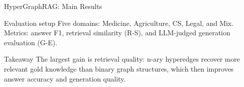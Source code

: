 \begin{frame}{HyperGraphRAG: Main Results}
\scriptsize
\begin{block}{Evaluation setup}
Five domains: Medicine, Agriculture, CS, Legal, and Mix. Metrics: answer F1, retrieval similarity (R-S), and LLM-judged generation evaluation (G-E).
\end{block}
\centering
{}
\vspace{0.2cm}
\begin{block}{Takeaway}
The largest gain is retrieval quality: n-ary hyperedges recover more relevant gold knowledge than binary graph structures, which then improves answer accuracy and generation quality.
\end{block}
\end{frame}
